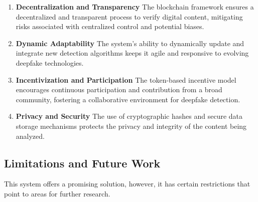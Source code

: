 \documentclass{article}
\begin{document}
\begin{enumerate}
    \item \textbf{Decentralization and Transparency} The blockchain framework ensures a decentralized and transparent process to verify digital content, mitigating risks associated with centralized control and potential biases.
    \item \textbf{Dynamic Adaptability} The system's ability to dynamically update and integrate new detection algorithms keeps it agile and responsive to evolving deepfake technologies.
    \item \textbf{Incentivization and Participation} The token-based incentive model encourages continuous participation and contribution from a broad community, fostering a collaborative environment for deepfake detection.
    \item \textbf{Privacy and Security} The use of cryptographic hashes and secure data storage mechanisms protects the privacy and integrity of the content being analyzed.
\end{enumerate}

\subsection{Limitations and Future Work}

This system offers a promising solution, however, it has certain restrictions that point to areas for further research.
\end{document}
